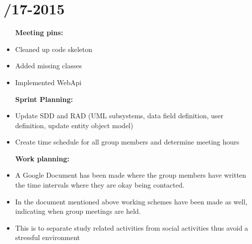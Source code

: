 \section{/17-2015} %
\attend{\at}{\nat}{\at}{\at}


\begin{itemize}
	\item [\textbf{Meeting pins:}]
	\item Cleaned up code skeleton
	\item Added missing classes
	\item Implemented WebApi
\end{itemize}

\begin{itemize}
	\item [\textbf{Sprint Planning:}]
	\item Update SDD and RAD (UML subsystems, data field definition, user definition, update entity object model)
	\item Create time schedule for all group members and determine meeting hours
\end{itemize}

\begin{itemize}
	\item [\textbf{Work planning:}]
	\item A Google Document has been made where the group members have written the time intervals where they are okay being contacted.
	\item In the document mentioned above working schemes have been made as well, indicating when group meetings are held. 
	\item This is to separate study related activities from social activities thus avoid a stressful environment
\end{itemize}